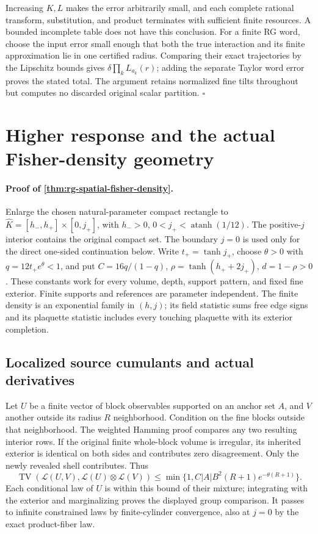 Increasing \(K,L\) makes the error arbitrarily small, and each complete
rational transform, substitution, and product terminates with sufficient
finite resources. A bounded incomplete table does not have this
conclusion. For a finite RG word, choose the input error small enough that
both the true interaction and its finite approximation lie in one
certified radius. Comparing their exact trajectories by the Lipschitz
bounds gives \(\delta\prod_kL_{a_k}(r)\); adding the separate Taylor
word error proves the stated total. The argument retains normalized fine
tilts throughout but computes no discarded original scalar partition.
\hfill\(\square\)
\section{Higher response and the actual Fisher-density geometry}
\label{sec:rg-spatial-proof-fisher}

\paragraph{Proof of \cref{thm:rg-spatial-fisher-density}.}
Enlarge the chosen natural-parameter compact rectangle to
\(\widehat K=[h_-,h_+]\times[0,j_+]\), with \(h_->0\),
\(0<j_+<\operatorname{atanh}(1/12)\). The positive-\(j\) interior
contains the original compact set. The boundary \(j=0\) is used only for
the direct one-sided continuation below. Write
\(t_+=\tanh j_+\), choose \(\theta>0\) with
\(q=12t_+e^\theta<1\), and put
\(C=16q/(1-q)\), \(\rho=\tanh(h_++2j_+)\), \(d=1-\rho>0\).
These constants work for every volume, depth, support pattern, and fixed
fine exterior. Finite supports and references are parameter independent.
The finite density is an exponential family in \((h,j)\); its field
statistic sums free edge signs and its plaquette statistic includes every
touching plaquette with its exterior completion.

\subsection{Localized source cumulants and actual derivatives}
\label{sec:rg-spatial-proof-higher-response}

Let \(U\) be a finite vector of block observables supported on an anchor
set \(A\), and \(V\) another outside its radius \(R\) neighborhood.
Condition on the fine blocks outside that neighborhood. The weighted
Hamming proof compares any two resulting interior rows. If the original
finite whole-block volume is irregular, its inherited exterior is identical
on both sides and contributes zero disagreement. Only the newly revealed
shell contributes. Thus
\begin{equation}
 \operatorname{TV}(\mathcal L(U,V),\mathcal L(U)\otimes\mathcal L(V))
 \le\min\{1,C|A|B^2(R+1)e^{-\theta(R+1)}\}.
 \label{eq:rg-spatial-proof-group-decoupling}
\end{equation}
Each conditional law of \(U\) is within this bound of their mixture;
integrating with the exterior and marginalizing proves the displayed group
comparison. It passes to infinite constrained laws by finite-cylinder
convergence, also at \(j=0\) by the exact product-fiber law.

